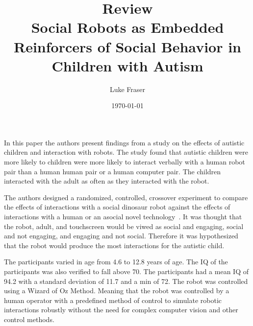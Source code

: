 \documentclass{article}
\begin{document}
\title{{\large Review} \\ Social Robots as Embedded Reinforcers of Social Behavior in Children with Autism}
\author{Luke Fraser}
\date{\today}
\maketitle

\begingroup
\renewcommand{\section}[2]{}


\endgroup

\section*{Summary}
In this paper the authors present findings from a study on the effects of autistic children and interaction with robots. The study found that autistic children were more likely to children were more likely to interact verbally with a human robot pair than a human human pair or a human computer pair. The children interacted with the adult as often as they interacted with the robot.

The authors designed a randomized, controlled, crossover experiment to compare the effects of interactions with a social dinosaur robot against the effects of interactions with a human or an asocial novel technology~\cite{goossens93}. It was thought that the robot, adult, and touchscreen would be viwed as social and engaging, social and not engaging, and engaging and not social. Therefore it was hypothesized that the robot would produce the most interactions for the autistic child.

The participants varied in age from 4.6 to 12.8 years of age. The IQ of the participants was also verified to fall above 70. The participants had a mean IQ of 94.2 with a standard deviation of 11.7 and a min of 72. The robot was controlled using a Wizard of Oz Method. Meaning that the robot was controlled by a human operator with a predefined method of control to simulate robotic interactions robustly without the need for complex computer vision and other control methods.
\end{document}
